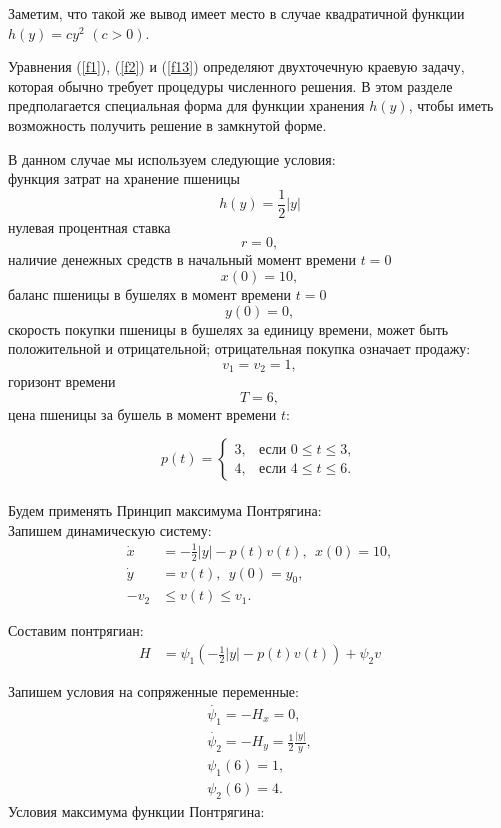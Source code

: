 Заметим, что такой же вывод имеет место в случае квадратичной функции $ h(y) = c y^2 $ $(c>0)$.
 
 
Уравнения (\ref{f1}), (\ref{f2}) и (\ref{f13}) определяют двухточечную краевую задачу, которая обычно требует процедуры численного решения. В этом разделе предполагается специальная форма для функции хранения ${h (y)}$, чтобы иметь возможность получить решение в замкнутой форме.

В данном случае мы используем следующие условия:\\
функция затрат на хранение пшеницы $$ {h(y)} = \frac{1}{2}|y|$$
нулевая процентная ставка $$ {r} = 0, $$
наличие денежных средств в начальный  момент времени $t=0$ $$ {x(0)} = 10, $$
баланс пшеницы в бушелях в момент времени $t = 0$ $$ {y(0)} = 0, $$
скорость покупки пшеницы в бушелях за единицу времени, может быть положительной и отрицательной; отрицательная покупка означает продажу: $$ {v_{1}} = {v_{2}} = 1, $$
горизонт времени $$ {T} = 6, $$
цена пшеницы за бушель в момент времени $t$:

\begin{displaymath}
p(t) =\left\{ \begin{array}{ll}
 3, & \textrm{если $0 \le t\le 3,$}\\
 4, & \textrm{если $4  \le t  \le 6.$}
  \end{array} \right.
\end{displaymath}\\


Будем применять Принцип максимума Понтрягина:\\

Запишем динамическую систему:
\begin{align}
    \Dot{x} & = - \frac{1}{2}|y| - p(t) v(t),\,\; x(0) = 10, \\
    \Dot{y} & = v(t), \,\; y(0) = y_{0},\\
    - v_2 & \le v(t) \le v_1.
\end{align}     

Составим понтрягиан: 
\begin{align}
{H} & = \psi_{1} (- \frac{1}{2}|y| - p(t) v(t)) + \psi_{2} v
\end{align} 

Запишем условия на сопряженные переменные:
\begin{gather}
 \Dot{\psi_{1}} = -H_x = 0,\\
 \Dot{\psi_{2}} = -H_y =  \frac{1}{2}\frac{|y|}{y}, \label{f21}\\
    {\psi_{1}(6)} = 1,\\
    {\psi_{2}(6)} = 4.\label{f23}
\end{gather}
Условия максимума функции Понтрягина:

